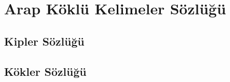 
\chapter{Arap Köklü Kelimeler Sözlüğü}
\noindent
\setlength{\parindent}{0pt}


\newpage

\recalctypearea
{}
\section{Kipler Sözlüğü}



\newpage
\section{Kökler Sözlüğü}




\restoregeometry
\recalctypearea


